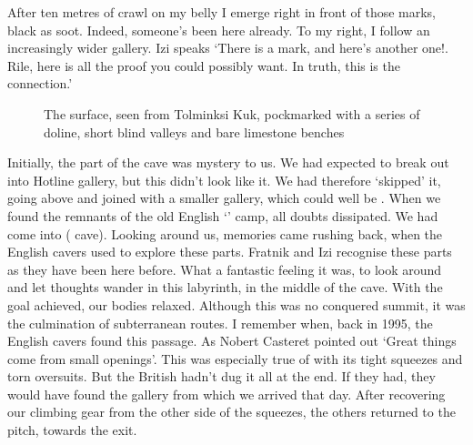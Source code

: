After ten metres of crawl on my belly I emerge right in front of those marks, black as soot. Indeed, someone's been here already. To my right, I follow an increasingly wider gallery. Izi speaks `There is a mark, and here's another one!. Rile, here is all the proof you could possibly want. In truth, this is the connection.'


 \begin{figure}[t!]
\checkoddpage \ifoddpage \forcerectofloat \else \forceversofloat \fi
\centering
{}
\caption{The \protect{} surface, seen from Tolminksi Kuk, pockmarked with a series of doline, short blind valleys and bare limestone benches }
\label{mig seen from kuk}
\end{figure}


 Initially, the part of the cave was mystery to us. We had expected to break out into Hotline gallery, but this didn't look like it. We had therefore `skipped' it, going above and joined with a smaller gallery, which could well be . When we found the remnants of the old English `' camp, all doubts dissipated. We had come into  ( cave). Looking around us, memories came rushing back, when the English cavers used to explore these parts. Fratnik and Izi recognise these parts as they have been here before. What a fantastic feeling it was, to look around and let thoughts wander in this labyrinth, in the middle of the cave. With the goal achieved, our bodies relaxed. Although this was no conquered summit, it was the culmination of subterranean routes. I remember when, back in 1995, the English cavers found this passage. As Nobert Casteret pointed out `Great things come from small openings'. This was especially true of with its tight squeezes and torn oversuits. But the British hadn't dug it all at the end. If they had, they would have found the gallery from which we arrived that day. After recovering our climbing gear from the other side of the squeezes, the others returned to the pitch, towards the exit.

